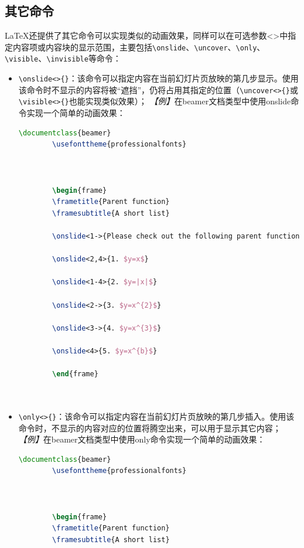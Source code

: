 \subsection{其它命令}
LaTeX还提供了其它命令可以实现类似的动画效果，同样可以在可选参数<>中指定内容项或内容块的显示范围，主要包括\texttt{\textbackslash{}onslide}、\texttt{\textbackslash{}uncover}、\texttt{\textbackslash{}only}、\texttt{\textbackslash{}visible}、\texttt{\textbackslash{}invisible}等命令：
\begin{itemize}
    \item \texttt{\textbackslash{}onslide<>\{\}}：该命令可以指定内容在当前幻灯片页放映的第几步显示。使用该命令时不显示的内容将被“遮挡”，仍将占用其指定的位置（\texttt{\textbackslash{}uncover<>\{\}}或\texttt{\textbackslash{}visible<>\{\}}也能实现类似效果）；
          \emph{【例】}在beamer文档类型中使用onslide命令实现一个简单的动画效果：
          \begin{lstlisting}[language=TeX]
        \documentclass{beamer}
        \usefonttheme{professionalfonts}

        

        \begin{frame}
        \frametitle{Parent function}
        \framesubtitle{A short list}

        \onslide<1->{Please check out the following parent function list.}

        \onslide<2,4>{1. $y=x$}

        \onslide<1-4>{2. $y=|x|$}

        \onslide<2->{3. $y=x^{2}$}

        \onslide<3->{4. $y=x^{3}$}

        \onslide<4>{5. $y=x^{b}$}

        \end{frame}

        
    \end{lstlisting}
    \item \texttt{\textbackslash{}only<>\{\}}：该命令可以指定内容在当前幻灯片页放映的第几步插入。使用该命令时，不显示的内容对应的位置将腾空出来，可以用于显示其它内容；
          \emph{【例】}在beamer文档类型中使用only命令实现一个简单的动画效果：
          \begin{lstlisting}[language=TeX]
        \documentclass{beamer}
        \usefonttheme{professionalfonts}

        

        \begin{frame}
        \frametitle{Parent function}
        \framesubtitle{A short list}


\end{lstlisting}
\end{itemize}

